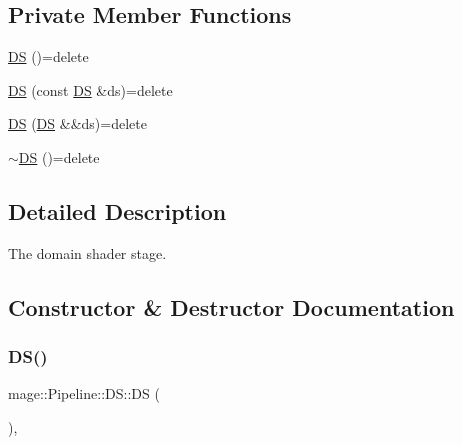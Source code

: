 \subsection*{Private Member Functions}
\begin{DoxyCompactItemize}
\item 
\hyperlink{structmage_1_1_pipeline_1_1_d_s_aa0f4d2c02dbb95acc3295df228819f59}{DS} ()=delete
\item 
\hyperlink{structmage_1_1_pipeline_1_1_d_s_a1e7b1f22f10de3fa85d516dd2c55bcaf}{DS} (const \hyperlink{structmage_1_1_pipeline_1_1_d_s}{DS} \&ds)=delete
\item 
\hyperlink{structmage_1_1_pipeline_1_1_d_s_a3903e76a32a2a18b46c5831bdc8ef59e}{DS} (\hyperlink{structmage_1_1_pipeline_1_1_d_s}{DS} \&\&ds)=delete
\item 
\hyperlink{structmage_1_1_pipeline_1_1_d_s_a29b54c6f7ee495bcf49983894a7206ce}{$\sim$\+DS} ()=delete
\end{DoxyCompactItemize}


\subsection{Detailed Description}
The domain shader stage. 

\subsection{Constructor \& Destructor Documentation}
\hypertarget{structmage_1_1_pipeline_1_1_d_s_aa0f4d2c02dbb95acc3295df228819f59}{}\label{structmage_1_1_pipeline_1_1_d_s_aa0f4d2c02dbb95acc3295df228819f59} 
\subsubsection{\texorpdfstring{D\+S()}{DS()}\hspace{0.1cm}{\footnotesize\ttfamily [1/3]}}
{\footnotesize\ttfamily mage\+::\+Pipeline\+::\+D\+S\+::\+DS (\begin{DoxyParamCaption}{ }\end{DoxyParamCaption})\hspace{0.3cm}{\ttfamily [private]}, {\ttfamily [delete]}}

\hypertarget{structmage_1_1_pipeline_1_1_d_s_a1e7b1f22f10de3fa85d516dd2c55bcaf}{}\label{structmage_1_1_pipeline_1_1_d_s_a1e7b1f22f10de3fa85d516dd2c55bcaf} 
